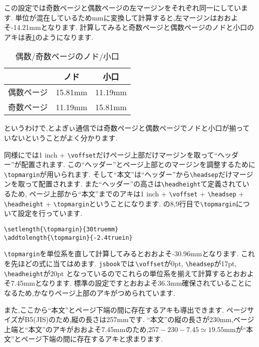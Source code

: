 この設定では奇数ページと偶数ページの左マージンをそれぞれ同一にしています.
単位が混在しているためmmに変換して計算すると,左マージンはおおよそ-14.21mmとなります.
計算してみると奇数ページと偶数ページのノドと小口のアキは表\ref{tbl:oddevenmargins}のようになります.
\begin{table}[!ht]
	\centering
	\caption{偶数/奇数ページのノド/小口}
	\label{tbl:oddevenmargins}
	\begin{tabular}{c|cc} \hline \hline
		& ノド & 小口 \\ \hline
		偶数ページ & 15.81mm & 11.19mm \\
		奇数ページ & 11.19mm & 15.81mm \\ \hline
	\end{tabular}
\end{table} 

というわけで,とよぎぃ通信では奇数ページと偶数ページでノドと小口が揃っていないということがよく分かります.

同様に{\pLaTeX}では1 inch + \verb|\voffset|だけページ上部だけマージンを取って``ヘッダー''が配置されます.
この``ヘッダー''とページ上部とのマージンを調整するために\verb|\topmargin|が用いられます.
そして``本文''は``ヘッダー''から\verb|\headsep|だけマージンを取って配置されます.
また``ヘッダー''の高さは\verb|\headheight|て定義されているため,
ページ上部から``本文''までのアキは1 inch + \verb|\voffset| + \verb|\headsep| + \verb|\headheight| + \verb|\topmargin|ということになります.
の8,9行目で\verb|\topmargin|について設定を行っています.
\begin{verbatim}
\setlength{\topmargin}{30truemm}
\addtolength{\topmargin}{-2.4truein}
\end{verbatim}
\verb|\topmargin|を単位系を直して計算してみるとおおよそ-30.96mmとなります.
これを先ほどの式に当てはめます. 
\verb|jsbook|では\,\verb|\voffset|が0pt, \verb|\headsep|が17pt, \verb|\headheight|が20pt
となっているのでこれらの単位系を揃えて計算するとおおよそ7.45mmとなります.
標準の設定ですとおおよそ36.3mm確保されていることになるため,かなりページ上部のアキがつめられています.

また,ここから``本文''とページ下端の間に存在するアキも導出できます.
ページサイズがB5(JIS)のため,縦の長さは257mmです.
``本文''の縦の長さが230mm,ページ上端と``本文''のアキがおおよそ7.45mmのため,$257 - 230 - 7.45 \simeq 19.55\mathrm{mm}$が``本文''とページ下端の間に存在するアキと求まります.

